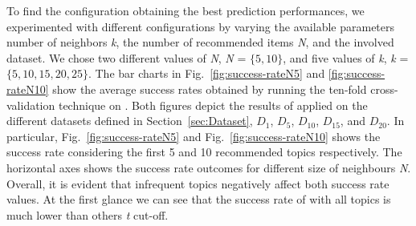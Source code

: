 To find the configuration obtaining the best prediction performances, we experimented with different \TF configurations by varying the available parameters \ie number of neighbors \emph{k}, the number of recommended items \emph{N}, and the involved dataset.   %
We chose two different values of \emph{N}, \ie \emph{N} = $\{5, 10\}$, and five values of \emph{k}, \ie \emph{k} = $\{5, 10, 15, 20, 25\}$. 
The bar charts in Fig.~\ref{fig:success-rateN5} and \ref{fig:success-rateN10} show the average success rates obtained by running the ten-fold cross-validation technique on \TF. %
Both figures depict the results of \TF applied on the different datasets defined in Section~\ref{sec:Dataset}, \ie $D_{1}$, $D_{5}$, $D_{10}$, $D_{15}$, and $D_{20}$.
In particular, Fig.~\ref{fig:success-rateN5} and Fig.~\ref{fig:success-rateN10} shows the success rate considering the first 5 and 10 recommended topics respectively. The horizontal axes shows the success rate outcomes for different size of neighbours \emph{N}.
Overall, it is evident that infrequent topics negatively affect both success rate values. At the first glance we can see that the success rate of \TF with all topics is much lower than others \emph{t} cut-off.
